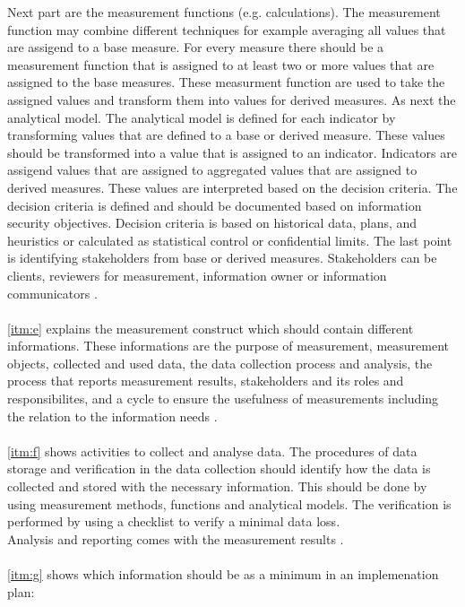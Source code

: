 Next part are the measurement functions (e.g. calculations). The measurement function may combine different techniques for example averaging all values that are assigend to a base measure. For every measure there should be a measurement function that is assigned to at least two or more values that are assigned to the base measures. These measurment function are used to take the assigned values and transform them into values for derived measures. As next the analytical model. The analytical model is defined for each indicator by transforming values that are defined to a base or derived measure. These values should be transformed into a value that is assigned to an indicator. Indicators are assigend values that are assigned to aggregated values that are assigned to derived measures. These values are interpreted based on the decision criteria. The decision criteria is defined and should be documented based on information security objectives. Decision criteria is based on historical data, plans, and heuristics or calculated as statistical control or confidential limits. The last point is identifying stakeholders from base or derived measures. Stakeholders can be clients, reviewers for measurement, information owner or information communicators \cite{ISO_27004_2009}. \\ \\
\ref{itm:e} explains the measurement construct which should contain different informations. These informations are the purpose of measurement, measurement objects, collected and used data, the data collection process and analysis, the process that reports measurement results, stakeholders and its roles and responsibilites, and a cycle to ensure the usefulness of measurements including the relation to the information needs \cite{ISO_27004_2009}. \\ \\
\ref{itm:f} shows activities to collect and analyse data. The procedures of data storage and verification in the data collection should identify how the data is collected and stored with the necessary information. This should be done by using measurement methods, functions and analytical models. The verification is performed by using a checklist to verify a minimal data loss. \\
Analysis and reporting comes with the measurement results \cite{ISO_27004_2009}.  \\ \\
\ref{itm:g} shows which information should be as a minimum in an implemenation plan:

